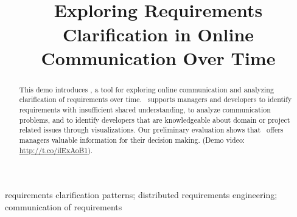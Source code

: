 
\title{\viss\\Exploring Requirements Clarification in Online Communication Over Time}


\author{
}

\maketitle


\begin{abstract}
This demo introduces \viss, a tool for exploring online communication and analyzing clarification of requirements over time.
\viss\ supports managers and developers to identify requirements with insufficient shared understanding, to analyze communication problems, and to identify developers that are knowledgeable about domain or project related issues through visualizations.
Our preliminary evaluation shows that \viss\ offers managers valuable information for their decision making.
(Demo video: \url{http://t.co/ilExAoB1}).
\end{abstract}

\begin{IEEEkeywords}
requirements clarification patterns; distributed requirements engineering; communication of requirements
\end{IEEEkeywords}
